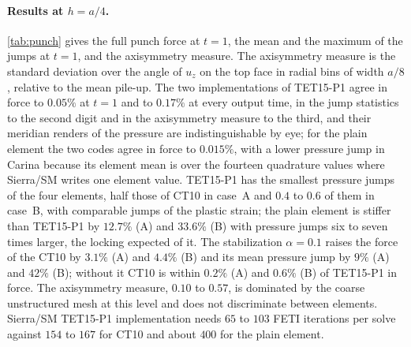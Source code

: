 \documentclass{article}
\theoremstyle{definition}
\theoremstyle{plain}
\begin{document}
\paragraph{Results at $h = a/4$.} \cref{tab:punch} gives the full
punch force at $t = 1$, the mean and the maximum of the jumps at $t = 1$,
and the axisymmetry measure. The axisymmetry
measure is the standard deviation over the angle of $u_z$ on the top face in
radial bins of width $a/8$, relative to the mean pile-up. The two
implementations of TET15-P1 agree in force to $0.05\%$ at $t = 1$ and to
$0.17\%$ at every output time, in the jump statistics to the second digit
and in the axisymmetry measure to the third, and their meridian renders of
the pressure are indistinguishable by eye; for the plain element the two
codes agree in force to $0.015\%$, with a lower pressure jump in Carina
because its element mean is over the fourteen quadrature values where
Sierra/SM writes one element value. TET15-P1 has the smallest pressure jumps
of the four elements, half those of CT10 in case~A and
$0.4$ to $0.6$ of them in case~B, with comparable jumps of the plastic
strain; the plain element is stiffer than TET15-P1 by $12.7\%$ (A) and
$33.6\%$ (B) with pressure jumps six to seven times larger, the locking
expected of it. The stabilization $\alpha = 0.1$ raises the force of the
CT10 by $3.1\%$ (A) and $4.4\%$ (B) and its mean pressure
jump by $9\%$ (A) and $42\%$ (B); without it CT10 is
within $0.2\%$ (A) and $0.6\%$ (B) of TET15-P1 in force. The axisymmetry
measure, $0.10$ to $0.57$, is dominated by the coarse unstructured mesh at
this level and does not discriminate between elements. Sierra/SM TET15-P1
implementation needs $65$ to $103$ FETI iterations per solve against $154$
to $167$ for CT10 and about $400$ for the plain
element.
\end{document}
